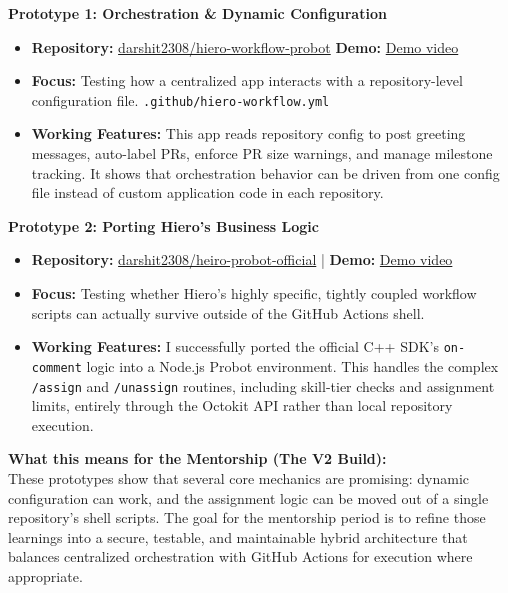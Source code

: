\documentclass[11pt]{article}
\begin{document}
\vspace{5pt}
\noindent
\textbf{Prototype 1: Orchestration \& Dynamic Configuration}
\begin{itemize}[leftmargin=18pt,itemsep=2pt,topsep=2pt]
\item \textbf{Repository:} \href{https://github.com/darshit2308/hiero-workflow-probot}{darshit2308/hiero-workflow-probot} \newline
\textbf{Demo:} \href{https://youtu.be/P9EdRm2D2v8}{Demo video}
\item \textbf{Focus:} Testing how a centralized app interacts with a repository-level configuration file. \newline
\texttt{.github/hiero-workflow.yml}
\item \textbf{Working Features:} This app reads repository config to post greeting messages, auto-label PRs, enforce PR size warnings, and manage milestone tracking. It shows that orchestration behavior can be driven from one config file instead of custom application code in each repository.
\end{itemize}

\vspace{5pt}
\noindent
\textbf{Prototype 2: Porting Hiero's Business Logic}
\begin{itemize}[leftmargin=18pt,itemsep=2pt,topsep=2pt]
\item \textbf{Repository:} \href{https://github.com/darshit2308/heiro-probot-official}{darshit2308/heiro-probot-official} | \textbf{Demo:} \href{https://youtu.be/EVA5NBKnafA}{Demo video}
\item \textbf{Focus:} Testing whether Hiero's highly specific, tightly coupled workflow scripts can actually survive outside of the GitHub Actions shell.
\item \textbf{Working Features:} I successfully ported the official C++ SDK's \texttt{on-comment} logic into a Node.js Probot environment. This handles the complex \texttt{/assign} and \texttt{/unassign} routines, including skill-tier checks and assignment limits, entirely through the Octokit API rather than local repository execution.
\end{itemize}

\vspace{5pt}
\noindent
\textbf{What this means for the Mentorship (The V2 Build):} \\
These prototypes show that several core mechanics are promising: dynamic configuration can work, and the assignment logic can be moved out of a single repository's shell scripts. The goal for the mentorship period is to refine those learnings into a secure, testable, and maintainable hybrid architecture that balances centralized orchestration with GitHub Actions for execution where appropriate.
\end{document}

